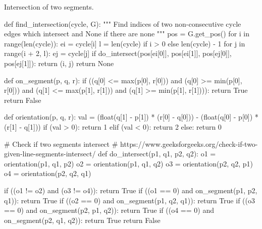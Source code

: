 Intersection of two segments.
\begin{sageCell}
def find_intersection(cycle, G):
    """
    Find indices of two non-consecutive cycle edges which intersect and None if there are none
    """
    pos = G.get_pos()
    for i in range(len(cycle)):
        ei = cycle[i]
        l = len(cycle) if i > 0 else len(cycle) - 1
        for j in range(i + 2, l):
            ej = cycle[j]
            if do_intersect(pos[ei[0]], pos[ei[1]], pos[ej[0]], pos[ej[1]]):
                return (i, j)
    return None

def on_segment(p, q, r):
    if ((q[0] <= max(p[0], r[0])) and (q[0] >= min(p[0], r[0])) and
        (q[1] <= max(p[1], r[1])) and (q[1] >= min(p[1], r[1]))):
        return True
    return False

def orientation(p, q, r):
    val = (float(q[1] - p[1]) * (r[0] - q[0])) - (float(q[0] - p[0]) * (r[1] - q[1]))
    if (val > 0):
        return 1
    elif (val < 0):
        return 2
    else:
        return 0

# Check if two segments intersect
# https://www.geeksforgeeks.org/check-if-two-given-line-segments-intersect/
def do_intersect(p1, q1, p2, q2):
    o1 = orientation(p1, q1, p2)
    o2 = orientation(p1, q1, q2)
    o3 = orientation(p2, q2, p1)
    o4 = orientation(p2, q2, q1)

    if ((o1 != o2) and (o3 != o4)):
        return True
    if ((o1 == 0) and on_segment(p1, p2, q1)):
        return True
    if ((o2 == 0) and on_segment(p1, q2, q1)):
        return True
    if ((o3 == 0) and on_segment(p2, p1, q2)):
        return True
    if ((o4 == 0) and on_segment(p2, q1, q2)):
        return True
    return False
\end{sageCell}



